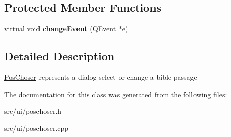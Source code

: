 \subsection*{Protected Member Functions}
\begin{CompactItemize}
\item 
\hypertarget{classPosChoser_6276f8db33ff1839cf500f371ebb2de1}{
virtual void \textbf{changeEvent} (QEvent $\ast$e)}
\label{classPosChoser_6276f8db33ff1839cf500f371ebb2de1}

\end{CompactItemize}


\subsection{Detailed Description}
\hyperlink{classPosChoser}{PosChoser} represents a dialog select or change a bible passage 

The documentation for this class was generated from the following files:\begin{CompactItemize}
\item 
src/ui/poschoser.h\item 
src/ui/poschoser.cpp\end{CompactItemize}
